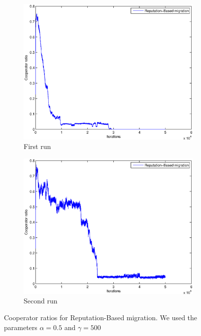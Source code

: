 \documentclass[11pt]{article}
\begin{document}
\begin{figure}
	\centering
	\begin{subfigure}[t]{0.48\textwidth}
        \includegraphics[width=\textwidth]{../../other/plots/convergence-50000.eps}
	\caption{First run}
    	\end{subfigure}
	\begin{subfigure}[t]{0.48\textwidth}
        \includegraphics[width=\textwidth]{../../other/plots/convergence-50000-2.eps}
	\caption{Second run}
    	\end{subfigure}

	\caption{Cooperator ratios for Reputation-Based migration. We used the parameters $\alpha = 0.5$ and $\gamma = 500$}
	\label{fig:convergence_reputation}
\end{figure}
\end{document}
